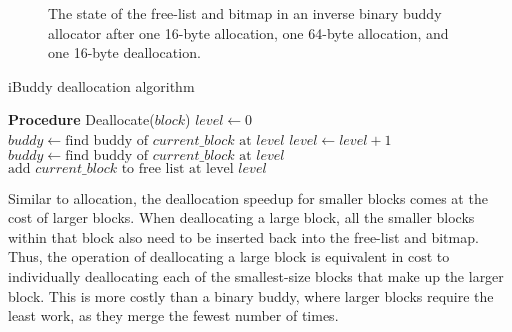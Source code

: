 \begin{figure}[h]
    \centering
    
    \caption{The state of the free-list and bitmap in an inverse binary buddy allocator after one
        16-byte allocation, one 64-byte allocation, and one 16-byte deallocation.}
    \label{fig:ibuddydeallocated}
\end{figure}

\begin{algorithm}[h]
    \caption{iBuddy deallocation algorithm}
    \label{alg:ibuddy_dealloc}
    \begin{algorithmic}[1]
        \Statex \textbf{Procedure} Deallocate($block$)
        \State $level \gets 0$
        \State $buddy \gets \text{find buddy of } current\_block \text{ at } level$
        \State $level \gets level + 1$
        \State $buddy \gets \text{find buddy of } current\_block \text{ at } level$
        \EndWhile
        \State $\text{add } current\_block \text{ to free list at level } level$
        \EndFor

    \end{algorithmic}
\end{algorithm}

Similar to allocation, the deallocation speedup for smaller blocks comes at the cost of larger blocks. When deallocating a large block, all the smaller blocks within that block also need to be inserted back into the free-list and bitmap. Thus, the operation of deallocating a large block is equivalent in cost to individually deallocating each of the smallest-size blocks that make up the larger block. This is more costly than a binary buddy, where larger blocks require the least work, as they merge the fewest number of times.